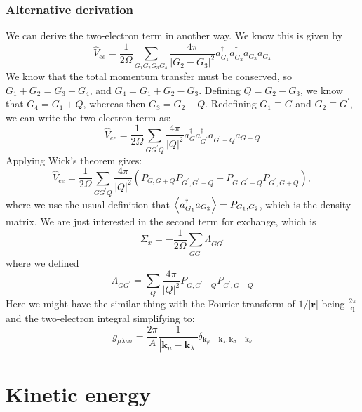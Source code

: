 \documentclass[12pt]{article}
\begin{document}
\subsubsection{Alternative derivation}
We can derive the two-electron term in another way. We know this is given by
\begin{equation}
    \hat{V}_{ee} = \frac{1}{2 \Omega } \sum_{G_1 G_2 G_3 G_4} \frac{4\pi}{|G_2-G_3|^2} a^\dagger_{G_1} a^\dagger_{G_2} a_{G_3} a_{G_4}
\end{equation}
We know that the total momentum transfer must be conserved, so $G_1 + G_2 = G_3 + G_4$, and $G_4 = G_1 + G_2 - G_3$. Defining $Q=G_2-G_3$, we know that $G_4 = G_1 + Q$, whereas then $G_3 = G_2 - Q$. Redefining $G_1 \equiv G$ and $G_2 \equiv G^\prime$, we can write the two-electron term as:
\begin{equation}
    \hat{V}_{ee} = \frac{1}{2 \Omega } \sum_{G G^\prime Q} \frac{4\pi}{|Q|^2} a^\dagger_{G} a^\dagger_{G^\prime} a_{G^\prime - Q} a_{G + Q}
\end{equation}
Applying Wick's theorem gives:
\begin{equation}
    \hat{V}_{ee} = \frac{1}{2 \Omega } \sum_{G G^\prime Q} \frac{4\pi}{|Q|^2} \left( P_{G,G+Q}P_{G^\prime, G^\prime - Q} - P_{G, G^\prime - Q}P_{G^\prime, G + Q} \right),
\end{equation}
where we use the usual definition that $\expval{a^\dagger_{G_1} a_{G_2}} = P_{G_1, G_2}$, which is the density matrix.
We are just interested in the second term for exchange, which is 
\begin{equation}
    \Sigma _{x} = -\frac{1}{2 \Omega } \sum_{G G^\prime} \Lambda _{G G^\prime}
\end{equation}
where we defined
\begin{equation}
    \Lambda _{G G^\prime} = \sum_{Q} \frac{4\pi}{|Q|^2} P_{G, G^\prime - Q}P_{G^\prime, G + Q}
\end{equation}
Here we might have the similar thing with the Fourier transform of $1/|\mathbf{r}|$ being $\frac{2\pi}{\mathbf{q}}$ and the two-electron integral simplifying to:
\begin{equation}
    g_{\mu\lambda\nu\sigma} = \frac{2\pi}{A} \frac{1}{|\mathbf{k}_\mu - \mathbf{k}_\lambda|} \delta_{\mathbf{k}_\mu - \mathbf{k}_\lambda, \mathbf{k}_\sigma - \mathbf{k}_\nu}
\end{equation}


\section{Kinetic energy}
\end{document}
